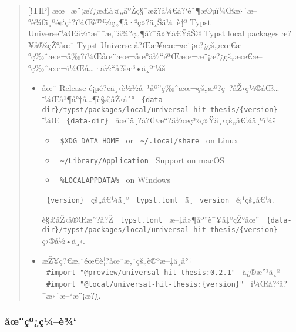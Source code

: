 \begin{Shaded}
\begin{Highlighting}[]
\end{Highlighting}
\end{Shaded}

\begin{quote}
{[}!TIP{]}
æœ¬æ¨¡æ?¿æ­£å¤„äºŽç§¯æž?å¼€å?{}`é˜¶æ®µï¼Œæ›´æ--°è¾ƒä¸ºé¢`ç¹?ï¼Œè™½ç„¶å·²ç»?ä¸Šä¼~è‡³
Typst Universeï¼Œä½†æ˜¯æ‚¨ä¾?ç„¶å?¯ä»¥å€ŸåŠ© Typst local packages
æ?¥å®žçŽ°åœ¨ Typst Universe
å?Œæ­¥æœ¬æ¨¡æ?¿çš„æœ€æ--°ç‰ˆæœ¬å‰?ï¼Œåœ¨æœ¬åœ°ä½``éªŒæœ¬æ¨¡æ?¿çš„æœ€æ--°ç‰ˆæœ¬ï¼Œå\ldots·ä½``å?šæ³•ä¸ºï¼š

\begin{itemize}
\item
  åœ¨ Release
  é¡µé?¢ä¸‹è½½å¯¹åº''ç‰ˆæœ¬çš„æº?ç~?åŽ‹ç¼©åŒ\ldots ï¼Œå¹¶å°†å\ldots¶è§£åŽ‹åˆ°
  \texttt{\ \{data-dir\}/typst/packages/local/universal-hit-thesis/\{version\}\ }
  ï¼Œ \texttt{\ \{data-dir\}\ } åœ¨ä¸?å?Œæ``?ä½œç³»ç»Ÿä¸‹çš„å€¼ä¸ºï¼š

  \begin{itemize}
  \tightlist
  \item
    \texttt{\ \$XDG\_DATA\_HOME\ } or
    \texttt{\ \textasciitilde{}/.local/share\ } on Linux
  \item
    \texttt{\ \textasciitilde{}/Library/Application\ } Support on macOS
  \item
    \texttt{\ \%LOCALAPPDATA\%\ } on Windows
  \end{itemize}

  \texttt{\ \{version\}\ } çš„å€¼ä¸º \texttt{\ typst.toml\ } ä¸­
  \texttt{\ version\ } é¡¹çš„å€¼.

  è§£åŽ‹å®Œæˆ?å?Ž \texttt{\ typst.toml\ } æ--‡ä»¶åº''è¯¥å‡ºçŽ°åœ¨
  \texttt{\ \{data-dir\}/typst/packages/local/universal-hit-thesis/\{version\}\ }
  ç›®å½•ä¸‹.
\item
  æŽ¥ç?€æ‚¨éœ€è¦?åœ¨æ‚¨çš„è®ºæ--‡ä¸­å°†
  \texttt{\ \#import\ "@preview/universal-hit-thesis:0.2.1"\ }
  ä¿®æ''¹ä¸º
  \texttt{\ \#import\ "@local/universal-hit-thesis:\{version\}"\ }
  ï¼Œå?³å?¯æ›´æ--°æ¨¡æ?¿.
\end{itemize}
\end{quote}

\subsubsection{åœ¨çº¿ç¼--è¾`}\label{uxe5ux153uxe7uxbauxe7uxbcuxe8uxbe}


